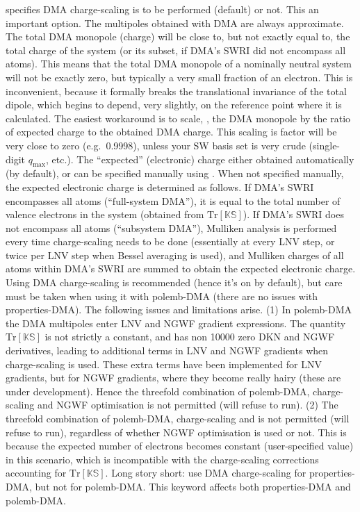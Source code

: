 \documentclass[letterpaper,10pt,english]{sphinxmanual}
\begin{document}
 \textendash{} specifies DMA charge-scaling is to be
performed (default) or not. This an important option. The multipoles
obtained with DMA are always approximate. The total DMA monopole
(charge) will be close to, but not exactly equal to, the total charge of
the system (or its subset, if DMA’s SWRI did not encompass all atoms).
This means that the total DMA monopole of a nominally neutral system
will not be exactly zero, but typically a very small fraction of an
electron. This is inconvenient, because it formally breaks the
translational invariance of the total dipole, which begins to depend,
very slightly, on the reference point where it is calculated. The
easiest workaround is to scale, , the DMA monopole by the
ratio of expected charge to the obtained DMA charge. This scaling is
factor will be very close to zero (e.g. 0.9998), unless your SW basis
set is very crude (single-digit \(q_{\textrm{max}}\), etc.). The
“expected” (electronic) charge either obtained automatically (by
default), or can be specified manually using
. When not specified manually, the expected
electronic charge is determined as follows. If DMA’s SWRI encompasses
all atoms (“full-system DMA”), it is equal to the total number of
valence electrons in the system (obtained from
\(\textrm{Tr}\left[\mathbb{KS}\right]\)). If DMA’s SWRI does not
encompass all atoms (“subsystem DMA”), Mulliken analysis is performed
every time charge-scaling needs to be done (essentially at every LNV
step, or twice per LNV step when Bessel averaging is used), and Mulliken
charges of all atoms within DMA’s SWRI are summed to obtain the expected
electronic charge. Using DMA charge-scaling is recommended (hence it’s
on by default), but care must be taken when using it with polemb-DMA
(there are no issues with properties-DMA). The following issues and
limitations arise. (1) In polemb-DMA the DMA multipoles enter LNV and
NGWF gradient expressions. The quantity
\(\textrm{Tr}\left[\mathbb{KS}\right]\) is not strictly a constant,
and has non 10000 zero DKN and NGWF derivatives, leading to additional
terms in LNV and NGWF gradients when charge-scaling is used. These extra
terms have been implemented for LNV gradients, but  for NGWF
gradients, where they become really hairy (these are under development).
Hence the threefold combination of polemb-DMA, charge-scaling and NGWF
optimisation is not permitted (will refuse to run). (2) The threefold
combination of polemb-DMA, charge-scaling and
 is not permitted (will refuse to run),
regardless of whether NGWF optimisation is used or not. This is because
the expected number of electrons becomes constant (user-specified value)
in this scenario, which is incompatible with the charge-scaling
corrections accounting for \(\textrm{Tr}\left[\mathbb{KS}\right]\).
Long story short: use DMA charge-scaling for properties-DMA, but not for
polemb-DMA. This keyword affects both properties-DMA and polemb-DMA.
\end{document}
